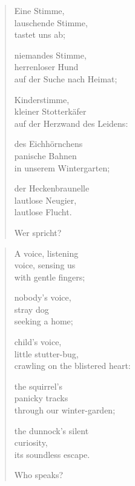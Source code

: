 
\cleartoverso


\begin{verse}
Eine Stimme,\\
lauschende Stimme,\\
tastet uns ab;

niemandes Stimme,\\
herrenloser Hund\\
auf der Suche nach Heimat;

Kinderstimme,\\
kleiner Stotterkäfer\\
auf der Herzwand des Leidens:

des Eichhörnchens\\
panische Bahnen\\
in unserem Wintergarten;

der Heckenbraunelle\\
lautlose Neugier,\\
lautlose Flucht.

Wer spricht?
\end{verse}

\cleartorecto


\begin{verse}
A voice, listening\\
voice, sensing us\\
with gentle fingers;

nobody's voice,\\
stray dog\\
seeking a home;

child's voice,\\
little stutter-bug,\\
crawling on the blistered heart:

the squirrel's\\
panicky tracks\\
through our winter-garden;

the dunnock's silent\\
curiosity,\\
its soundless escape.

Who speaks?
\end{verse}
